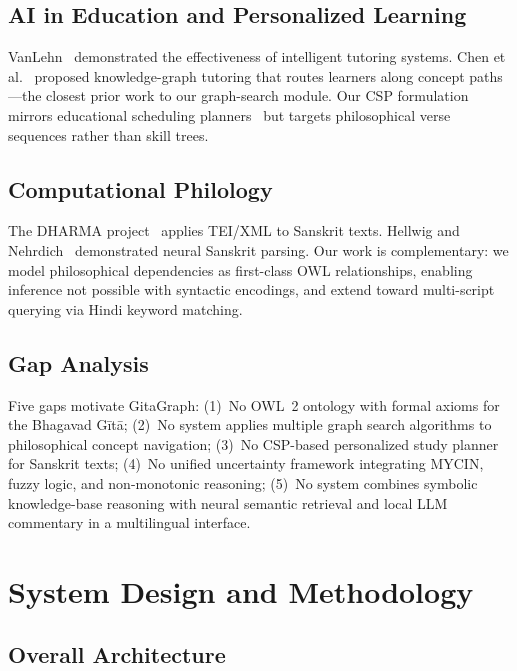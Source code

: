 \documentclass[conference]{IEEEtran}
\begin{document}
\subsection{AI in Education and Personalized Learning}

VanLehn~\cite{vanlehn2011relative} demonstrated the effectiveness of
intelligent tutoring systems. Chen et al.~\cite{chen2018kgtutor} proposed
knowledge-graph tutoring that routes learners along concept paths—the closest
prior work to our graph-search module. Our CSP formulation mirrors educational
scheduling planners~\cite{kumar1992algorithms} but targets philosophical verse
sequences rather than skill trees.

\subsection{Computational Philology}

The DHARMA project~\cite{dharma2020} applies TEI/XML to Sanskrit texts.
Hellwig and Nehrdich~\cite{hellwig2018sanskrit} demonstrated neural Sanskrit
parsing. Our work is complementary: we model philosophical dependencies as
first-class OWL relationships, enabling inference not possible with syntactic
encodings, and extend toward multi-script querying via Hindi keyword matching.

\subsection{Gap Analysis}

Five gaps motivate GitaGraph:
(1)~No OWL~2 ontology with formal axioms for the Bhagavad G\={i}t\={a};
(2)~No system applies multiple graph search algorithms to philosophical
concept navigation;
(3)~No CSP-based personalized study planner for Sanskrit texts;
(4)~No unified uncertainty framework integrating MYCIN, fuzzy logic, and
non-monotonic reasoning;
(5)~No system combines symbolic knowledge-base reasoning with neural
semantic retrieval and local LLM commentary in a multilingual interface.

\section{System Design and Methodology}

\subsection{Overall Architecture}
\end{document}

